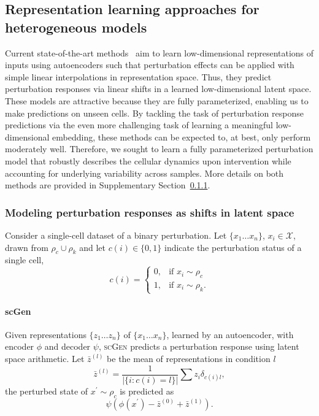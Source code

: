 \subsection{Representation learning approaches for heterogeneous models}  %
Current state-of-the-art methods~\citep{Lopez2018scvi, lotfollahi2019scgen, yang2020predicting} aim to learn low-dimensional representations of inputs using autoencoders such that perturbation effects can be applied with simple linear interpolations in representation space. Thus, they predict perturbation responses via linear shifts in a learned low-dimensional latent space. These models are attractive because they are fully parameterized, enabling us to make predictions on unseen cells. By tackling the task of perturbation response predictions via the even more challenging task of learning a meaningful low-dimensional embedding, these methods can be expected to, at best, only perform moderately well. Therefore, we sought to learn a fully parameterized perturbation model that robustly describes the cellular dynamics upon intervention while accounting for underlying variability across samples. More details on both methods are provided in Supplementary Section~\ref{supp:ae_methods}.

\subsubsection{Modeling perturbation responses as shifts in latent space} \label{supp:ae_methods}
Consider a single-cell dataset of a binary perturbation.
Let $\{x_1 \ldots x_n\}$, $x_i \in \mathcal{X}$, drawn from $\rho_c \cup \rho_k$
and let $c(i) \in \{0, 1\}$ indicate the perturbation status of a single cell,
\[
    c(i) = 
\begin{cases}
    0, & \text{if } x_i \sim \rho_c\\
    1, & \text{if } x_i \sim \rho_k.
\end{cases}
\]

\paragraph{scGen}
Given representations $\{z_1 \ldots z_n \}$ of $\{x_1 \ldots x_n\}$, learned by an autoencoder, with encoder $\phi$ and decoder $\psi$,
\textsc{scGen} \citep{lotfollahi2019scgen} predicts a perturbation response using latent space arithmetic.
Let $\bar{z}^{(l)}$ be the mean of representations in condition $l$
\begin{equation*}
    \bar{z}^{(l)} = \frac{1}{|\{i: c(i) = l\}|} \sum{z_i \delta_{c(i)l}},
\end{equation*}
the perturbed state of $x^\prime \sim \rho_c$ is predicted as
\begin{equation*}
    \psi(\phi(x^\prime) - \bar{z}^{(0)} + \bar{z}^{(1)}).
\end{equation*}

